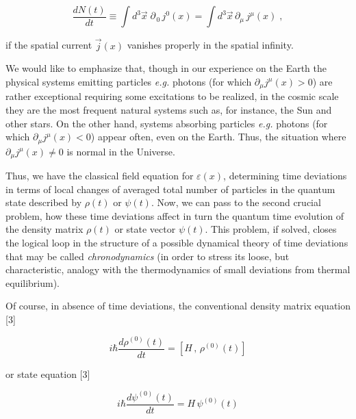 \documentclass[a4paper,12pt]{article}
\begin{document}
\begin{equation}
\frac{d N(t)}{dt} \equiv \int d^3\vec{x}\; \partial_{\,0}\, j^0(x) = \int d^3\vec{x}\,\partial_\mu\, j^\mu(x)\;, 
\end{equation}

\ni if the spatial current $\vec{j}(x)$ vanishes properly in the spatial infinity.

We would like to emphasize that, though in our experience on the Earth the physical systems emitting particles {\it e.g.} photons (for which $\partial_\mu j^\mu (x) > 0$) are rather exceptional requiring some excitations to be realized, in the cosmic scale they are the most frequent natural systems such as, for instance,  the Sun and other stars. On the other hand, systems absorbing particles {\it e.g.} photons (for which $\partial_\mu j^\mu (x) < 0$) appear often, even on the Earth. Thus, the situation where $\partial_\mu j^\mu (x) \neq 0$ is normal in the Universe.

\vspace{0.2cm}


\vspace{0.2cm}

Thus, we have the classical field equation for $\varepsilon(x)$, determining time deviations in terms of local changes of averaged total number of particles in the quantum state described by $\rho(t)$ or $\psi(t)$. Now, we can pass to the second crucial problem, how these time deviations affect in turn the quantum time evolution of the density matrix $\rho(t)$ or state vector $\psi(t)$. This problem, if solved, closes the logical loop in the structure of a possible dynamical theory of time deviations that may be called {\it chronodynamics} (in order to stress its loose, but characteristic, analogy with the thermodynamics of small deviations from thermal equilibrium).

Of course, in absence of time deviations, the conventional density matrix equation [3]

\begin{equation}
i \hbar \frac{d\rho^{(0)}(t)}{dt} = [H\,,\,\rho^{(0)}(t)]
\end{equation}

\ni or state equation [3]

\begin{equation}
i \hbar \frac{d\psi^{(0)}(t)}{dt} = H\,\psi^{(0)}(t)
\end{equation}
\end{document}
